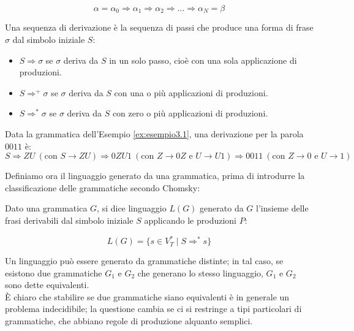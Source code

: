 \documentclass{article}
\begin{document}
\[ \alpha = \alpha_0 \Rightarrow \alpha_1 \Rightarrow \alpha_2 \Rightarrow \ldots \Rightarrow \alpha_N = \beta \]
\begin{definition}
Una sequenza di derivazione è la sequenza di passi che produce una forma di frase \( \sigma \) dal simbolo iniziale \( S \):
\begin{itemize}
    \item \( S \Rightarrow \sigma \) se \( \sigma \) deriva da \( S \) in un solo passo, cioè con una sola applicazione di produzioni.
    \item \( S \Rightarrow^+ \sigma \) se \( \sigma \) deriva da \( S \) con una o più applicazioni di produzioni.
    \item \( S \Rightarrow^* \sigma \) se \( \sigma \) deriva da \( S \) con zero o più applicazioni di produzioni.
\end{itemize}
\end{definition}
\begin{example}
Data la grammatica dell'Esempio \ref{ex:esempio3.1}, una derivazione per la parola \(0011\) è:
\[
S \Rightarrow ZU \ (\text{con } S \rightarrow ZU) \Rightarrow 0ZU1 \ (\text{con } Z \rightarrow 0Z \text{ e } U \rightarrow U1) \Rightarrow 0011 \ (\text{con } Z \rightarrow 0 \text{ e } U \rightarrow 1)
\]
\end{example}

\noindent
Definiamo ora il linguaggio generato da una grammatica, prima di introdurre la classificazione delle grammatiche secondo Chomsky:
\begin{definition}
Dato una grammatica \( G \), si dice linguaggio \( L(G) \) generato da \( G \) l'insieme delle frasi derivabili dal simbolo iniziale \( S \) applicando le produzioni \( P \):

\[ L(G) = \{ s \in V_T^* \mid S \Rightarrow^* s \} \]
\end{definition}
\noindent Un linguaggio può essere generato da grammatiche distinte; in tal caso, se esistono due grammatiche \( G_1 \) e \( G_2 \) che generano lo stesso linguaggio, \( G_1 \) e \( G_2 \) sono dette equivalenti.\\
È chiaro che stabilire se due grammatiche siano equivalenti è in generale un problema indecidibile; la questione cambia se ci si restringe a tipi particolari di grammatiche, che abbiano regole di produzione alquanto semplici.
\end{document}

